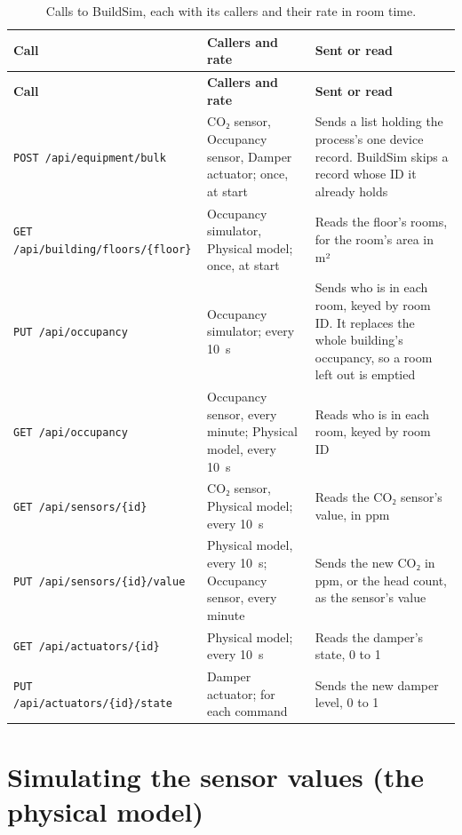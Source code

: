 \documentclass[11pt]{article}
\begin{document}
\begin{longtable}[]{@{}
  >{\raggedright\arraybackslash}p{}
  >{\raggedright\arraybackslash}p{}
  >{\raggedright\arraybackslash}p{}@{}}
\caption{Calls to BuildSim, each with its callers and their rate in room
time.}\label{tab:buildsim}\\
\toprule
\textbf{Call} & \textbf{Callers and rate} & \textbf{Sent or read} \\
\midrule
\endfirsthead
\toprule
\textbf{Call} & \textbf{Callers and rate} & \textbf{Sent or read} \\
\midrule
\endhead
\texttt{POST /api/equipment/\allowbreak bulk} & CO₂ sensor, Occupancy
sensor, Damper actuator; once, at start & Sends a list holding the
process's one device record. BuildSim skips a record whose ID it already
holds \\
\midrule
\texttt{GET /api/building/\allowbreak floors/\{floor\}} & Occupancy
simulator, Physical model; once, at start & Reads the floor's rooms, for
the room's area in m² \\
\midrule
\texttt{PUT /api/occupancy} & Occupancy simulator; every 10~s & Sends
who is in each room, keyed by room ID. It replaces the whole building's
occupancy, so a room left out is emptied \\
\midrule
\texttt{GET /api/occupancy} & Occupancy sensor, every minute; Physical
model, every 10~s & Reads who is in each room, keyed by room ID \\
\midrule
\texttt{GET /api/sensors/\{id\}} & CO₂ sensor, Physical model; every
10~s & Reads the CO₂ sensor's value, in ppm \\
\midrule
\texttt{PUT /api/sensors/\{id\}/\allowbreak value} & Physical model, every
10~s; Occupancy sensor, every minute & Sends the new CO₂ in ppm, or the
head count, as the sensor's value \\
\midrule
\texttt{GET /api/actuators/\{id\}} & Physical model; every 10~s & Reads
the damper's state, 0 to 1 \\
\midrule
\texttt{PUT /api/actuators/\{id\}/\allowbreak state} & Damper actuator;
for each command & Sends the new damper level, 0 to 1 \\
\bottomrule
\end{longtable}

\section{Simulating the sensor values (the physical model)}\label{sec:simulation}
\end{document}
